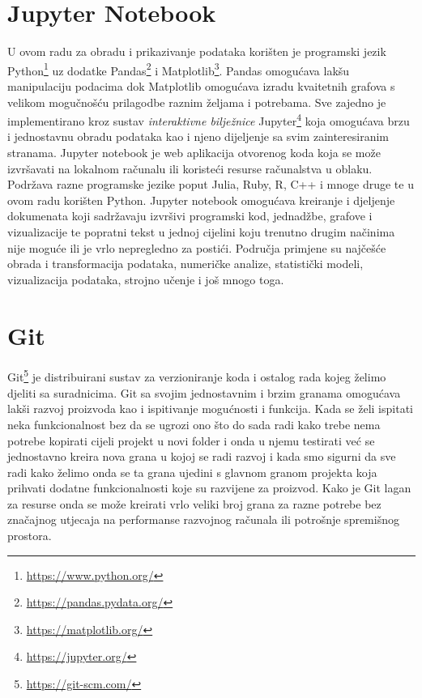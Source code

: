 \section{Jupyter Notebook}
U ovom radu za obradu i prikazivanje podataka korišten je programski jezik Python\footnote{\href{https://www.python.org/}{https://www.python.org/}} uz dodatke Pandas\footnote{\href{https://pandas.pydata.org/}{https://pandas.pydata.org/}} i Matplotlib\footnote{\href{https://matplotlib.org/}{https://matplotlib.org/}}.
Pandas omogućava lakšu manipulaciju podacima dok Matplotlib omogućava izradu kvaitetnih grafova s velikom mogučnošću prilagodbe raznim željama i potrebama.
Sve zajedno je implementirano kroz sustav \emph{interaktivne bilježnice} Jupyter\footnote{\href{https://jupyter.org/}{https://jupyter.org/}} koja omogućava brzu i jednostavnu obradu podataka kao i njeno dijeljenje sa svim zainteresiranim stranama.
Jupyter notebook je web aplikacija otvorenog koda koja se može izvršavati na lokalnom računalu ili koristeći resurse računalstva u oblaku.
Podržava razne programske jezike poput Julia, Ruby, R, C++ i mnoge druge te u ovom radu korišten Python.
Jupyter notebook omogućava kreiranje i djeljenje dokumenata koji sadržavaju izvršivi programski kod, jednadžbe, grafove i vizualizacije te popratni tekst u jednoj cijelini koju trenutno drugim načinima nije moguće ili je vrlo nepregledno za postići.
Područja primjene su najčešće obrada i transformacija podataka, numeričke analize, statistički modeli, vizualizacija podataka, strojno učenje i još mnogo toga.

\section{Git}
Git\footnote{\href{https://git-scm.com/}{https://git-scm.com/}} je distribuirani sustav za verzioniranje koda i ostalog rada kojeg želimo djeliti sa suradnicima.
Git sa svojim jednostavnim i brzim granama omogućava lakši razvoj proizvoda kao i ispitivanje mogućnosti i funkcija.
Kada se želi ispitati neka funkcionalnost bez da se ugrozi ono što do sada radi kako trebe nema potrebe kopirati cijeli projekt u novi folder i onda u njemu testirati već se jednostavno kreira nova grana u kojoj se radi razvoj i kada smo sigurni da sve radi kako želimo onda se ta grana ujedini s glavnom granom projekta koja prihvati dodatne funkcionalnosti koje su razvijene za proizvod.
Kako je Git lagan za resurse onda se može kreirati vrlo veliki broj grana za razne potrebe bez značajnog utjecaja na performanse razvojnog računala ili potrošnje spremišnog prostora.

